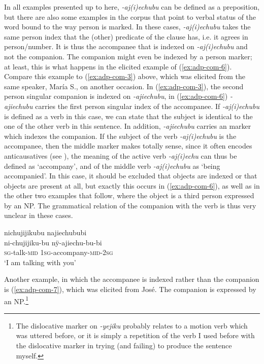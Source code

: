 In all examples presented up to here, \textit{-aj(i)echubu} can be defined as a preposition, but there are also some examples in the corpus that point to verbal status of the word bound to the way person is marked. In these cases, \textit{-aj(i)echubu} takes the same person index that the (other) predicate of the clause has, i.e. it agrees in person/number. It is thus the accompanee that is indexed on \textit{-aj(i)echubu} and not the companion. The companion might even be indexed by a person marker; at least, this is what happens in the elicited example of (\ref{ex:adp-com-6}). Compare this example to (\ref{ex:adp-com-3}) above, which was elicited from the same speaker, María S., on another occasion. In (\ref{ex:adp-com-3}), the second person singular companion is indexed on \textit{-ajiechubu}, in (\ref{ex:adp-com-6}) \textit{-ajiechubu} carries the first person singular  index of the accompanee. If \textit{-aj(i)echubu} is defined as a verb in this case, we can state that the subject is identical to the one of the other verb in this sentence. In addition, \textit{-ajiechubu} carries an  marker which indexes the companion. If the subject of the verb \textit{-aj(i)echubu} is the accompanee, then the middle marker makes totally sense, since it often encodes anticausatives (see ), the meaning of the active verb \textit{-aj(i)echu} can thus be defined as ‘accompany’, and of the middle verb \textit{-aj(i)echubu} as ‘being accompanied’. In this case, it should be excluded that objects are indexed or that objects are present at all, but exactly this occurs in (\ref{ex:adp-com-6}), as well as in the other two examples that follow, where the object is a third person expressed by an NP. The grammatical relation of the companion with the verb is thus very unclear in these cases.

\ea\label{ex:adp-com-6}
\begingl
\glpreamble nichujijikubu najiechububi\\
\gla ni-chujijiku-bu nÿ-ajiechu-bu-bi\\
\textsc{sg}-talk-\textsc{mid} 1\textsc{sg}-accompany-\textsc{mid}-2\textsc{sg}\\
\glft ‘I am talking with you’
\endgl
\trailingcitation{[mrx-e150219s.006]}
\xe

\largerpage
Another example, in which the accompanee is indexed rather than the companion is (\ref{ex:adp-com-7}), which was elicited from José. The companion is expressed by an NP.\footnote{The dislocative marker on \textit{-yejiku} probably relates to a motion verb which was uttered before, or it is simply a repetition of the verb I used before with the dislocative marker in trying (and failing) to produce the sentence myself.}

